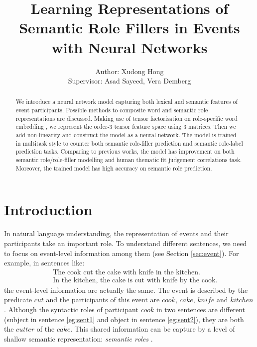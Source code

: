 \documentclass[a4paper]{article}
\title{Learning Representations of Semantic Role Fillers in Events with Neural Networks}
\author{Author: Xudong Hong \\ 
Supervisor: Asad Sayeed, Vera Demberg}
\begin{document}
\maketitle

\begin{abstract}
We introduce a neural network model capturing both lexical and semantic features of event participants. Possible methods to composite word and semantic role representations are discussed. Making use of tensor factorisation on role-specific word embedding \citep{tilk-EtAl:2016:EMNLP2016}, we represent the order-3 tensor feature space using 3 matrices. Then we add non-linearity and construct the model as a neural network. The model is trained in multitask style to counter both semantic role-filler prediction and semantic role-label prediction tasks. Comparing to previous works, the model has improvement on both semantic role/role-filler modelling and human thematic fit judgement correlations task. Moreover, the trained model has high accuracy on semantic role prediction. 
\end{abstract}



\section{Introduction} \label{sec:intro}
In natural language understanding, the representation of events and their participants take an important role. To understand different sentences, we need to focus on event-level information among them  (see Section \ref{sec:event}). For example, in sentences like: 
\begin{eqnarray}
    & &\text{The cook cut the cake with knife in the kitchen.}        \label{eg:sent1} \\   
    & &\text{In the kitchen, the cake is cut with knife by the cook.} \label{eg:sent2}
\end{eqnarray}
the event-level information are actually the same. The event is described by the predicate $cut$ and the participants of this event are $cook$, $cake$, $knife$ and $kitchen$. Although the syntactic roles of participant $cook$ in two sentences are different (subject in sentence \eqref{eg:sent1} and object in sentence \eqref{eg:sent2}), they are both the $cutter$ of the $cake$. This shared information can be capture by a level of shallow semantic representation: \textit{semantic roles} \citep{jurafsky2014speech}. 
\end{document}
